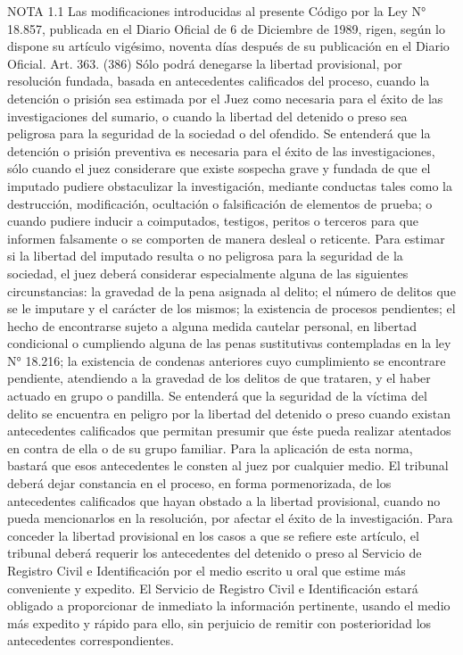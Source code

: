 NOTA 1.1
      Las modificaciones introducidas al presente Código por la Ley N° 18.857, publicada en el Diario Oficial de 6 de Diciembre de 1989, rigen, según lo dispone su artículo vigésimo, noventa días después de su publicación en el Diario Oficial.
    Art. 363. (386) Sólo podrá denegarse la libertad provisional, por resolución fundada, basada en antecedentes calificados del proceso, cuando la detención o prisión sea estimada por el Juez como necesaria para el éxito de las investigaciones del sumario, o cuando la libertad del detenido o preso sea peligrosa para la seguridad de la sociedad o del ofendido.
    Se entenderá que la detención o prisión preventiva es necesaria para el éxito de las investigaciones, sólo cuando el juez considerare que existe sospecha grave y fundada de que el imputado pudiere obstaculizar la investigación, mediante conductas tales como la destrucción, modificación, ocultación o falsificación de elementos de prueba; o cuando pudiere inducir a coimputados, testigos, peritos o terceros para que informen falsamente o se comporten de manera desleal o reticente.
    Para estimar si la libertad del imputado resulta o no peligrosa para la seguridad de la sociedad, el juez deberá considerar especialmente alguna de las siguientes circunstancias: la gravedad de la pena asignada al delito; el número de delitos que se le imputare y el carácter de los mismos; la existencia de procesos pendientes; el hecho de encontrarse sujeto a alguna medida cautelar personal, en libertad condicional o cumpliendo alguna de las penas sustitutivas contempladas en la ley N° 18.216; la existencia de condenas anteriores cuyo cumplimiento se encontrare pendiente, atendiendo a la gravedad de los delitos de que trataren, y el haber actuado en grupo o pandilla.
    Se entenderá que la seguridad de la víctima del delito se encuentra en peligro por la libertad del detenido o preso cuando existan antecedentes calificados que permitan presumir que éste pueda realizar atentados en contra de ella o de su grupo familiar. Para la aplicación de esta norma, bastará que esos antecedentes le consten al juez por cualquier medio.
    El tribunal deberá dejar constancia en el proceso, en forma pormenorizada, de los antecedentes calificados que hayan obstado a la libertad provisional, cuando no pueda mencionarlos en la resolución, por afectar el éxito de la investigación.
    Para conceder la libertad provisional en los casos a que se refiere este artículo, el tribunal deberá requerir los antecedentes del detenido o preso al Servicio de Registro Civil e Identificación por el medio escrito u oral que estime más conveniente y expedito. El Servicio de Registro Civil e Identificación estará obligado a proporcionar de inmediato la información pertinente, usando el medio más expedito y rápido para ello, sin perjuicio de remitir con posterioridad los antecedentes correspondientes.
